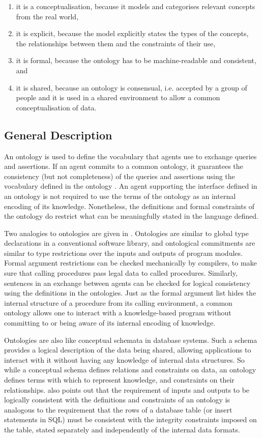 \documentclass{fast_latex}
\begin{document}
\begin{enumerate}
\item it is a conceptualisation, because it models and categorises
relevant concepts from the real world, 
\item it is explicit, because the model explicitly states the types of
the concepts, the relationships between them and the constraints of
their use, 
\item it is formal, because the ontology has to be machine-readable and
consistent, and 
\item it is shared, because an ontology is consensual, i.e. accepted by
a group of people and it is used in a shared environment to allow a
common conceptualisation of data. 
\end{enumerate}

\subsection{General Description}
An ontology is used to define the vocabulary that agents use to exchange
queries and assertions. If an agent commits to a common ontology, it
guarantees the consistency (but not completeness) of the queries and
assertions using the vocabulary defined in the ontology \cite{gruber93towards}.
An agent supporting the interface defined in an ontology is not
required to use the terms of the ontology as an internal encoding of
its knowledge. Nonetheless, the definitions and formal constraints of
the ontology do restrict what can be meaningfully stated in the
language defined. 

Two analogies to ontologies are given in \cite{gruber93towards}. Ontologies are
similar to global type declarations in a conventional software library,
and ontological commitments are similar to type restrictions over the
inputs and outputs of program modules. Formal argument restrictions can
be checked mechanically by compilers, to make sure that calling
procedures pass legal data to called procedures. Similarly, sentences
in an exchange between agents can be checked for logical consistency
using the definitions in the ontologies. Just as the formal argument
list hides the internal structure of a procedure from its calling
environment, a common ontology allows one to interact with a
knowledge-based program without committing to or being aware of its
internal encoding of knowledge. 

Ontologies are also like conceptual schemata in database systems. Such a
schema provides a logical description of the data being shared,
allowing applications to interact with it without having any knowledge
of internal data structures. So while a conceptual schema defines
relations and constraints on data, an ontology defines terms with which
to represent knowledge, and constraints on their relationships.
\cite{gruber2008ontology} also points out that the requirement of inputs and
outputs to be logically consistent with the definitions and constraints
of an ontology is analogous to the requirement that the rows of a
database table (or insert statements in SQL) must be consistent with
the integrity constraints imposed on the table, stated separately and
independently of the internal data formats. 
\end{document}
